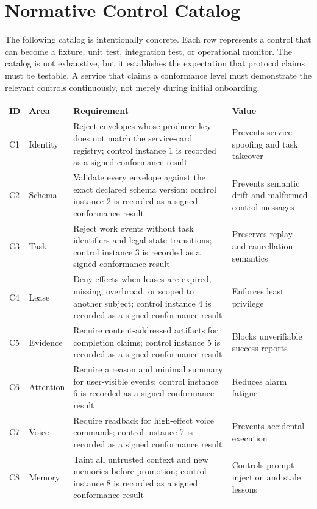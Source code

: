 \documentclass[10pt,journal,onecolumn]{IEEEtran}
\begin{document}
\section{Normative Control Catalog}
The following catalog is intentionally concrete. Each row represents a control that can become a fixture, unit test, integration test, or operational monitor. The catalog is not exhaustive, but it establishes the expectation that protocol claims must be testable. A service that claims a conformance level must demonstrate the relevant controls continuously, not merely during initial onboarding.
\begin{longtable}{P{0.06\textwidth} P{0.14\textwidth} P{0.48\textwidth} P{0.24\textwidth}}
\toprule
ID & Area & Requirement & Value \\
\midrule
C1 & Identity & Reject envelopes whose producer key does not match the service-card registry; control instance 1 is recorded as a signed conformance result & Prevents service spoofing and task takeover \\
C2 & Schema & Validate every envelope against the exact declared schema version; control instance 2 is recorded as a signed conformance result & Prevents semantic drift and malformed control messages \\
C3 & Task & Reject work events without task identifiers and legal state transitions; control instance 3 is recorded as a signed conformance result & Preserves replay and cancellation semantics \\
C4 & Lease & Deny effects when leases are expired, missing, overbroad, or scoped to another subject; control instance 4 is recorded as a signed conformance result & Enforces least privilege \\
C5 & Evidence & Require content-addressed artifacts for completion claims; control instance 5 is recorded as a signed conformance result & Blocks unverifiable success reports \\
C6 & Attention & Require a reason and minimal summary for user-visible events; control instance 6 is recorded as a signed conformance result & Reduces alarm fatigue \\
C7 & Voice & Require readback for high-effect voice commands; control instance 7 is recorded as a signed conformance result & Prevents accidental execution \\
C8 & Memory & Taint all untrusted context and new memories before promotion; control instance 8 is recorded as a signed conformance result & Controls prompt injection and stale lessons \\

\end{longtable}
\end{document}

